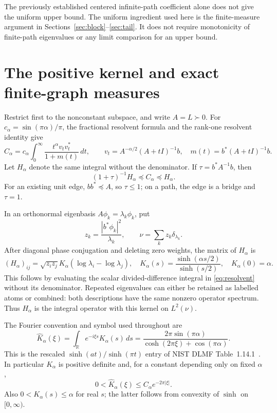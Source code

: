 \documentclass[11pt]{article}
\newcommand{\R}{\mathbb R}
\begin{document}
The previously established centered infinite-path coefficient alone
does not give the uniform upper bound. The uniform ingredient used
here is the finite-measure argument in
Sections~\ref{sec:block}--\ref{sec:tail}.
It does not require monotonicity of finite-path eigenvalues or any
limit comparison for an upper bound.

\section{The positive kernel and exact finite-graph measures}
Restrict first to the nonconstant subspace, and write $A=L\succ0$.
For $c_\alpha=\sin(\pi\alpha)/\pi$, the fractional resolvent formula
and the rank-one resolvent identity give
\begin{equation}\label{eq:resolvent}
 C_\alpha=c_\alpha\int_0^\infty
       \frac{t^\alpha v_tv_t^*}{1+m(t)}\,dt,
 \qquad v_t=A^{-\alpha/2}(A+tI)^{-1}b,
 \quad m(t)=b^*(A+tI)^{-1}b.
\end{equation}
Let $H_\alpha$ denote the same integral without the denominator.
If $\tau=b^*A^{-1}b$, then
\begin{equation}\label{eq:sandwich}
 (1+\tau)^{-1}H_\alpha\preceq C_\alpha\preceq H_\alpha.
\end{equation}
For an existing unit edge, $bb^*\preceq A$, so $\tau\le1$;
on a path, the edge is a bridge and $\tau=1$.

In an orthonormal eigenbasis $A\phi_k=\lambda_k\phi_k$, put
\[
 z_k=\frac{|b^*\phi_k|^2}{\lambda_k},\qquad
 \nu=\sum_k z_k\delta_{\lambda_k}.
\]
After diagonal phase conjugation and deleting zero weights, the matrix
of $H_\alpha$ is
\begin{equation}\label{eq:kernel}
 (H_\alpha)_{ij}=\sqrt{z_i z_j}
                 K_\alpha(\log\lambda_i-\log\lambda_j),
 \quad
 K_\alpha(s)=\frac{\sinh(\alpha s/2)}{\sinh(s/2)},
 \quad K_\alpha(0)=\alpha.
\end{equation}
This follows by evaluating the scalar divided-difference integral in
\eqref{eq:resolvent} without its denominator. Repeated eigenvalues
can either be retained as labelled atoms or combined: both descriptions
have the same nonzero operator spectrum. Thus $H_\alpha$ is the
integral operator with this kernel on $L^2(\nu)$.

The Fourier convention and symbol used throughout are
\begin{equation}\label{eq:fourier}
 \widehat K_\alpha(\xi)=\int_\R e^{-i\xi s}K_\alpha(s)\,ds
 =\frac{2\pi\sin(\pi\alpha)}
       {\cosh(2\pi\xi)+\cos(\pi\alpha)}.
\end{equation}
This is the rescaled $\sinh(at)/\sinh(\pi t)$ entry of NIST
DLMF Table~1.14.1~\cite{DLMF}. In particular $K_\alpha$ is positive
definite and, for a constant depending only on fixed $\alpha$,
\begin{equation}\label{eq:fourierdecay}
 0<\widehat K_\alpha(\xi)\le C_\alpha e^{-2\pi|\xi|}.
\end{equation}
Also $0<K_\alpha(s)\le\alpha$ for real $s$; the latter follows from
convexity of $\sinh$ on $[0,\infty)$.
\end{document}

